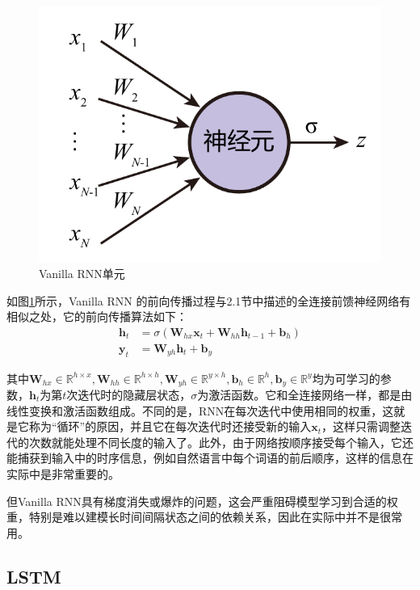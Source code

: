 \begin{figure}[]
    \centering
    \includegraphics[page=3]{figure/figures.pdf}
    \caption{Vanilla RNN单元}
    \label{vanilla-rnn}
\end{figure}

如图\ref{vanilla-rnn}所示，Vanilla RNN 的前向传播过程与2.1节中描述的全连接前馈神经网络有相似之处，它的前向传播算法如下：
\begin{align}
    \bm{h}_t&=\sigma\left(\bm{W}_{hx}\bm{x}_t+\bm{W}_{hh}\bm{h}_{t-1}+\bm{b}_h\right)\\
    \bm{y}_t&=\bm{W}_{yh}\bm{h}_t+\bm{b}_y
\end{align}

其中$\bm{W}_{hx}\in\mathbb{R}^{h\times x},\bm{W}_{hh}\in\mathbb{R}^{h\times h},\bm{W}_{yh}\in\mathbb{R}^{y\times h},\bm{b}_h\in\mathbb{R}^h,\bm{b}_y\in\mathbb{R}^y$均为可学习的参数，$\bm{h}_t$为第$t$次迭代时的隐藏层状态，$\sigma$为激活函数。它和全连接网络一样，都是由线性变换和激活函数组成。不同的是，RNN在每次迭代中使用相同的权重，这就是它称为“循环”的原因，并且它在每次迭代时还接受新的输入$\bm{x}_t$，这样只需调整迭代的次数就能处理不同长度的输入了。此外，由于网络按顺序接受每个输入，它还能捕获到输入中的时序信息，例如自然语言中每个词语的前后顺序，这样的信息在实际中是非常重要的。

但Vanilla RNN具有梯度消失或爆炸的问题，这会严重阻碍模型学习到合适的权重，特别是难以建模长时间间隔状态之间的依赖关系，因此在实际中并不是很常用。

\subsection{LSTM}

